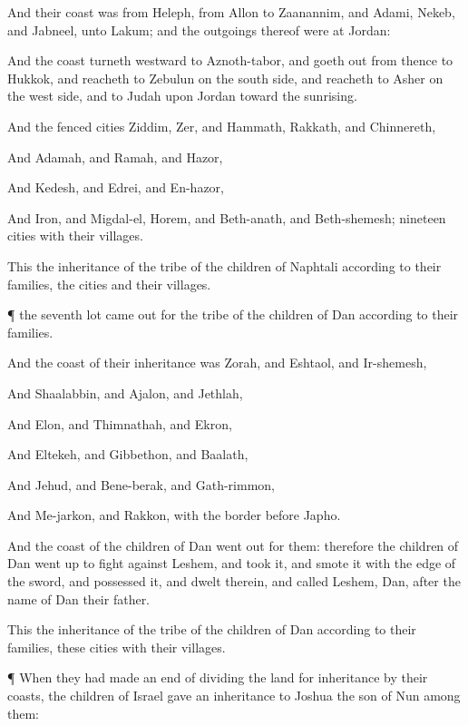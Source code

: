 {And their
coast was from
Heleph, from
Allon to
Zaanannim, and
Adami,
Nekeb, and
Jabneel, unto
Lakum; and the
outgoings thereof were at
Jordan:

And
{} the
coast
turneth
westward to
Aznoth-tabor, and goeth
out from thence to
Hukkok, and
reacheth to
Zebulun on the south
side, and
reacheth to
Asher on the west
side, and to
Judah upon
Jordan toward the
sunrising.

And the
fenced
cities
{}
Ziddim,
Zer, and
Hammath,
Rakkath, and
Chinnereth,

And
Adamah, and
Ramah, and
Hazor,

And
Kedesh, and
Edrei, and
En-hazor,

And
Iron, and
Migdal-el,
Horem, and
Beth-anath, and
Beth-shemesh;
nineteen
cities with their
villages.

This
{} the
inheritance of the
tribe of the
children of
Naphtali according to their
families, the
cities and their
villages.


\par }{\PP {}¶
{} the
seventh
lot came
out for the
tribe of the
children of
Dan according to their
families.

And the
coast of their
inheritance was
Zorah, and
Eshtaol, and
Ir-shemesh,

And
Shaalabbin, and
Ajalon, and
Jethlah,

And
Elon, and
Thimnathah, and
Ekron,

And
Eltekeh, and
Gibbethon, and
Baalath,

And
Jehud, and
Bene-berak, and
Gath-rimmon,

And
Me-jarkon, and
Rakkon, with the
border
before
Japho.

And the
coast of the
children of
Dan went
out
{} for them: therefore the
children of
Dan went
up to
fight against
Leshem, and
took it, and
smote it with the
edge of the
sword, and
possessed it, and
dwelt therein, and
called
Leshem,
Dan, after the
name of
Dan their
father.

This
{} the
inheritance of the
tribe of the
children of
Dan according to their
families, these
cities with their
villages.


\par }{\PP {}¶ When they had made an
end of dividing the
land for
inheritance by their
coasts, the
children of
Israel
gave an
inheritance to
Joshua the
son of
Nun
among them:

}
